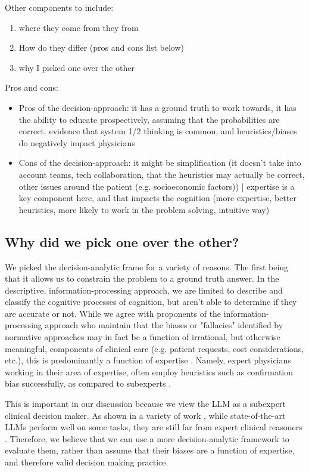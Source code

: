 Other components to include: 

\begin{enumerate}
    \item where they come from they from
    \item How do they differ (pros and cons list below)
    \item why I picked one over the other
\end{enumerate}


Pros and cons:
\begin{itemize}
    \item Pros of the decision-approach: it has a ground truth to work towards, it has the ability to educate prospectively, assuming that the probabilities are correct. evidence that system 1/2 thinking is common, and heuristics/biases do negatively impact physicians
    \item Cons of the decision-approach: it might be simplification (it doesn't take into account teams, tech collaboration, that the heuristics may actually be correct,  other issues around the patient (e.g. socioeconomic factors)) | expertise is a key component here, and that impacts the cognition (more expertise, better heuristics, more likely to work in the problem solving, intuitive way)
\end{itemize}

\subsection{Why did we pick one over the other?}
We picked the decision-analytic frame for a variety of reasons. The first being that it allows us to constrain the problem to a ground truth answer. In the descriptive, information-processing approach, we are limited to describe and classify the cognitive processes of cognition, but aren't able to determine if they are accurate or not. While we agree with proponents of the information-processing approach who maintain that the biases or "fallacies" identified by normative approaches may in fact be a function of irrational, but otherwise meaningful, components of clinical care (e.g. patient requests, cost considerations, etc.), this is predominantly a function of expertise \cite{patel1991general}. Namely, expert physicians working in their area of expertise, often employ heuristics such as confirmation bias successfully, as compared to subexperts \cite{patelEmergingParadigmsCognition2002a}.

This is important in our discussion because we view the LLM as a subexpert clinical decision maker. As shown in a variety of work \cite{}, while state-of-the-art LLMs perform well on some tasks, they are still far from expert clinical reasoners \cite{harrisLargeLanguageModels2023}. Therefore, we believe that we can use a more decision-analytic framework to evaluate them, rather than assume that their biases are a function of expertise, and therefore valid decision making practice.



